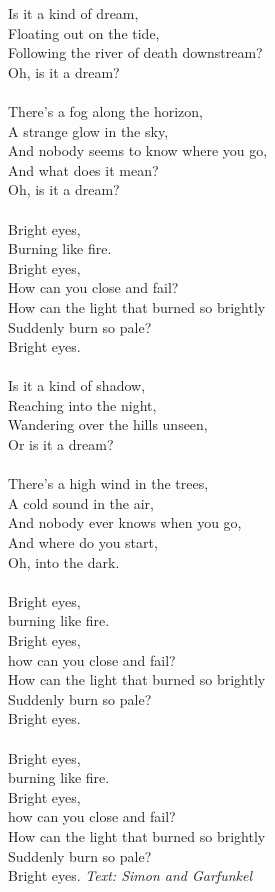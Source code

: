\vspace{10pt}
Is it a kind of dream,\\
Floating out on the tide,\\
Following the river of death downstream?\\
Oh, is it a dream?\\
\\
There's a fog along the horizon,\\
A strange glow in the sky,\\
And nobody seems to know where you go,\\
And what does it mean?\\
Oh, is it a dream?\\
\\
Bright eyes,\\
Burning like fire.\\
Bright eyes,\\
How can you close and fail?\\
How can the light that burned so brightly\\
Suddenly burn so pale?\\
Bright eyes.\\
\\
Is it a kind of shadow,\\
Reaching into the night,\\
Wandering over the hills unseen,\\
Or is it a dream?\\
\\
There's a high wind in the trees,\\
A cold sound in the air,\\
And nobody ever knows when you go,\\
And where do you start,\\
Oh, into the dark.\\
\\
Bright eyes,\\
burning like fire.\\
Bright eyes,\\
how can you close and fail?\\
How can the light that burned so brightly\\
Suddenly burn so pale?\\
Bright eyes.\\
\\
Bright eyes,\\
burning like fire.\\
Bright eyes,\\
how can you close and fail?\\
How can the light that burned so brightly\\
Suddenly burn so pale?\\
Bright eyes.
\vspace{10pt}
{\footnotesize\textit{Text: Simon and Garfunkel}}
